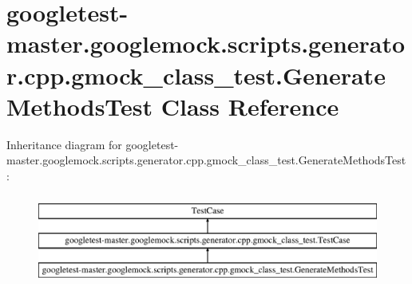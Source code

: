 \hypertarget{classgoogletest-master_1_1googlemock_1_1scripts_1_1generator_1_1cpp_1_1gmock__class__test_1_1_generate_methods_test}{}\section{googletest-\/master.googlemock.\+scripts.\+generator.\+cpp.\+gmock\+\_\+class\+\_\+test.\+Generate\+Methods\+Test Class Reference}
\label{classgoogletest-master_1_1googlemock_1_1scripts_1_1generator_1_1cpp_1_1gmock__class__test_1_1_generate_methods_test}
Inheritance diagram for googletest-\/master.googlemock.\+scripts.\+generator.\+cpp.\+gmock\+\_\+class\+\_\+test.\+Generate\+Methods\+Test\+:\begin{figure}[H]
\begin{center}
\leavevmode
\includegraphics[height=3.000000cm]{d9/db6/classgoogletest-master_1_1googlemock_1_1scripts_1_1generator_1_1cpp_1_1gmock__class__test_1_1_generate_methods_test}
\end{center}
\end{figure}
